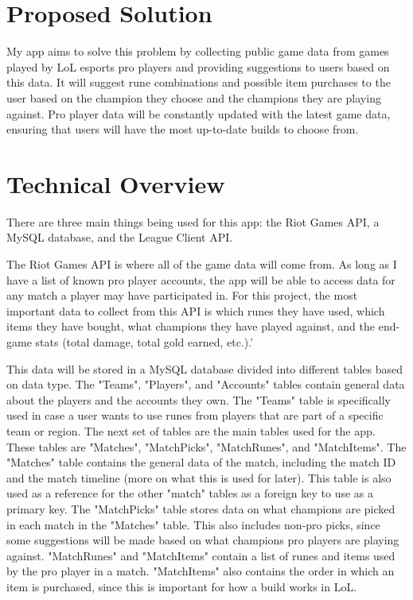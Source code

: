 \documentclass[10pt,twocolumn]{article}
\begin{document}
\section{Proposed Solution}
My app aims to solve this problem by collecting public game data from games played by LoL esports pro players and providing suggestions to users based on this data.
It will suggest rune combinations and possible item purchases to the user based on the champion they choose and the champions they are playing against.
Pro player data will be constantly updated with the latest game data, ensuring that users will have the most up-to-date builds to choose from.

\section{Technical Overview}
There are three main things being used for this app: the Riot Games API, a MySQL database, and the League Client API.

The Riot Games API is where all of the game data will come from.
As long as I have a list of known pro player accounts, the app will be able to access data for any match a player may have participated in.
For this project, the most important data to collect from this API is which runes they have used, which items they have bought, what champions they have played against, and the end-game stats (total damage, total gold earned, etc.).'

This data will be stored in a MySQL database divided into different tables based on data type. The "Teams", "Players", and "Accounts" tables contain general data about the players and the accounts they own. 
The "Teams" table is specifically used in case a user wants to use runes from players that are part of a specific team or region.
The next set of tables are the main tables used for the app. These tables are "Matches", "MatchPicks", "MatchRunes", and "MatchItems".
The "Matches" table contains the general data of the match, including the match ID and the match timeline (more on what this is used for later).
This table is also used as a reference for the other "match" tables as a foreign key to use as a primary key.
The "MatchPicks" table stores data on what champions are picked in each match in the "Matches" table.
This also includes non-pro picks, since some suggestions will be made based on what champions pro players are playing against.
"MatchRunes" and "MatchItems" contain a list of runes and items used by the pro player in a match.
"MatchItems" also contains the order in which an item is purchased, since this is important for how a build works in LoL.
\end{document}
